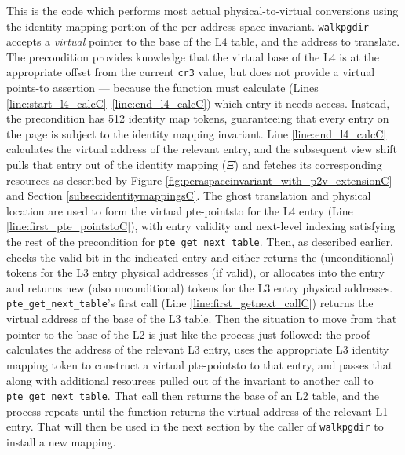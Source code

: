 This is the code which performs most actual physical-to-virtual conversions using the identity mapping portion of the per-address-space invariant.
\lstinline|walkpgdir| accepts a \emph{virtual} pointer to the base of the L4 table, and the address to translate.
The precondition provides knowledge that the virtual base of the L4 is at the appropriate offset from the current \lstinline|cr3| value,
but does not provide a virtual points-to assertion --- because the function must calculate (Lines \ref{line:start_l4_calcC}--\ref{line:end_l4_calcC})
which entry it needs access.
Instead, the precondition has 512 identity map tokens, guaranteeing that every entry on the page is subject to the identity mapping invariant.
Line \ref{line:end_l4_calcC} calculates the virtual address of the relevant entry, and the subsequent view shift
pulls that entry out of the identity mapping ($\Xi$) and fetches its corresponding resources as
described by Figure \ref{fig:peraspaceinvariant_with_p2v_extensionC} and Section \ref{subsec:identitymappingsC}.
The ghost translation and physical location are used to form the virtual pte-pointsto for the L4 entry
(Line \ref{line:first_pte_pointstoC}), with entry validity and next-level indexing
satisfying the rest of the precondition for \lstinline|pte_get_next_table|.
Then, as described earlier, checks the valid bit in the indicated
entry and either returns the (unconditional) tokens for the L3 entry physical addresses (if valid), or
allocates into the entry and returns new (also unconditional) tokens for the L3 entry physical addresses.
\lstinline|pte_get_next_table|'s first call (Line \ref{line:first_getnext_callC}) returns
the virtual address of the base of the L3 table. Then the situation to move from that pointer to the base of the L2
is just like the process just followed: the proof calculates the address of the relevant
L3 entry, uses the appropriate L3 identity mapping token to construct a virtual pte-pointsto to that entry,
and passes that along with additional resources pulled out of the invariant to another call to
\lstinline|pte_get_next_table|. That call then returns the base of an L2 table, and the process
repeats until the function returns the virtual address of the relevant L1 entry.
That will then be used in the next section by the caller of \lstinline|walkpgdir|
to install a new mapping.


